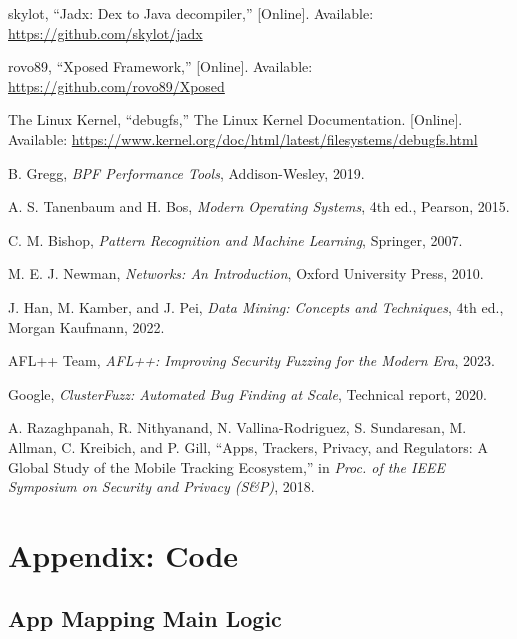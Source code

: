\documentclass[a4paper,12pt]{report}
\begin{document}
\begin{thebibliography}{99}
skylot, “Jadx: Dex to Java decompiler,” [Online]. Available: \url{https://github.com/skylot/jadx}

rovo89, “Xposed Framework,” [Online]. Available: \url{https://github.com/rovo89/Xposed}

The Linux Kernel, “debugfs,” The Linux Kernel Documentation. [Online]. Available: \url{https://www.kernel.org/doc/html/latest/filesystems/debugfs.html}

B. Gregg, \emph{BPF Performance Tools}, Addison-Wesley, 2019.

A. S. Tanenbaum and H. Bos, \emph{Modern Operating Systems}, 4th ed., Pearson, 2015.

C. M. Bishop, \emph{Pattern Recognition and Machine Learning}, Springer, 2007.

M. E. J. Newman, \emph{Networks: An Introduction}, Oxford University Press, 2010.

J. Han, M. Kamber, and J. Pei, \emph{Data Mining: Concepts and Techniques}, 4th ed., Morgan Kaufmann, 2022.

AFL++ Team, \emph{AFL++: Improving Security Fuzzing for the Modern Era}, 2023.

Google, \emph{ClusterFuzz: Automated Bug Finding at Scale}, Technical report, 2020.

A. Razaghpanah, R. Nithyanand, N. Vallina-Rodriguez, S. Sundaresan, M. Allman, C. Kreibich, and P. Gill, “Apps, Trackers, Privacy, and Regulators: A Global Study of the Mobile Tracking Ecosystem,” in \emph{Proc. of the IEEE Symposium on Security and Privacy (S\&P)}, 2018.

\end{thebibliography}
\appendix

\chapter{Appendix: Code}
\label{appendix:app-mapper-code}

\section*{App Mapping Main Logic}
\end{document}
